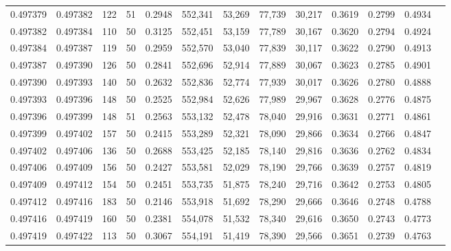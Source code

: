 \begin{tabular}{rrrrrrrrrrrrr}
0.497379 & 0.497382 &   122 &  51 &                                     0.2948 & 552,341 &  53,269 &  77,739 &  30,217 & 0.3619 & 0.2799 & 0.4934 \\
0.497382 & 0.497384 &   110 &  50 &                                     0.3125 & 552,451 &  53,159 &  77,789 &  30,167 & 0.3620 & 0.2794 & 0.4924 \\
0.497384 & 0.497387 &   119 &  50 &                                     0.2959 & 552,570 &  53,040 &  77,839 &  30,117 & 0.3622 & 0.2790 & 0.4913 \\
0.497387 & 0.497390 &   126 &  50 &                                     0.2841 & 552,696 &  52,914 &  77,889 &  30,067 & 0.3623 & 0.2785 & 0.4901 \\
0.497390 & 0.497393 &   140 &  50 &                                     0.2632 & 552,836 &  52,774 &  77,939 &  30,017 & 0.3626 & 0.2780 & 0.4888 \\
0.497393 & 0.497396 &   148 &  50 &                                     0.2525 & 552,984 &  52,626 &  77,989 &  29,967 & 0.3628 & 0.2776 & 0.4875 \\
0.497396 & 0.497399 &   148 &  51 &                                     0.2563 & 553,132 &  52,478 &  78,040 &  29,916 & 0.3631 & 0.2771 & 0.4861 \\
0.497399 & 0.497402 &   157 &  50 &                                     0.2415 & 553,289 &  52,321 &  78,090 &  29,866 & 0.3634 & 0.2766 & 0.4847 \\
0.497402 & 0.497406 &   136 &  50 &                                     0.2688 & 553,425 &  52,185 &  78,140 &  29,816 & 0.3636 & 0.2762 & 0.4834 \\
0.497406 & 0.497409 &   156 &  50 &                                     0.2427 & 553,581 &  52,029 &  78,190 &  29,766 & 0.3639 & 0.2757 & 0.4819 \\
0.497409 & 0.497412 &   154 &  50 &                                     0.2451 & 553,735 &  51,875 &  78,240 &  29,716 & 0.3642 & 0.2753 & 0.4805 \\
0.497412 & 0.497416 &   183 &  50 &                                     0.2146 & 553,918 &  51,692 &  78,290 &  29,666 & 0.3646 & 0.2748 & 0.4788 \\
0.497416 & 0.497419 &   160 &  50 &                                     0.2381 & 554,078 &  51,532 &  78,340 &  29,616 & 0.3650 & 0.2743 & 0.4773 \\
0.497419 & 0.497422 &   113 &  50 &                                     0.3067 & 554,191 &  51,419 &  78,390 &  29,566 & 0.3651 & 0.2739 & 0.4763 \\

\end{tabular}
